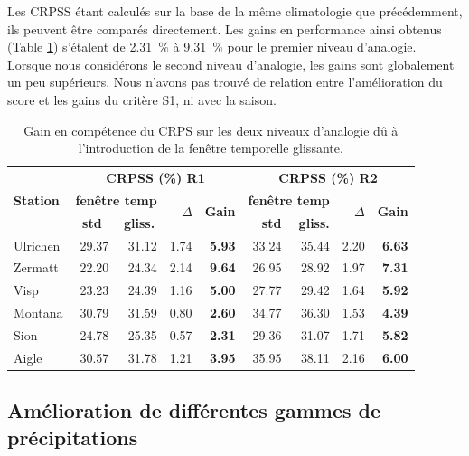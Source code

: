 \documentclass[hess]{copernicus}
\begin{document}
Les CRPSS étant calculés sur la base de la même climatologie que précédemment, ils peuvent être comparés directement. Les gains en performance ainsi obtenus (Table \ref{tab:fenetre_glissante:Gains_CRPSS}) s'étalent de 2.31~\% à 9.31~\% pour le premier niveau d'analogie. Lorsque nous considérons le second niveau d'analogie, les gains sont globalement un peu supérieurs. Nous n'avons pas trouvé de relation entre l'amélioration du score et les gains du critère S1, ni avec la saison.


\begin{table}[htb]
	\caption{Gain en compétence du CRPS sur les deux niveaux d'analogie dû à l'introduction de la fenêtre temporelle glissante.}
	\begin{center}
		\begin{tabular}{l r r r r r r r r}
			\hline
			\multirow{3}{*}{\textbf{Station}} & \multicolumn{ 4}{c}{\textbf{CRPSS (\%) R1}} & \multicolumn{ 4}{c}{\textbf{CRPSS (\%) R2}} \\
			& \multicolumn{ 2}{c}{\textbf{fenêtre temp}} & \multirow{2}{*}{\textbf{$\Delta$}} & \multirow{2}{*}{\textbf{Gain}} & \multicolumn{ 2}{c}{\textbf{fenêtre temp}} & \multirow{2}{*}{\textbf{$\Delta$}} & \multirow{2}{*}{\textbf{Gain}} \\
			& \multicolumn{1}{c}{\textbf{std}} & \multicolumn{1}{c}{\textbf{gliss.}} &  &  & \textbf{std} & \textbf{gliss.} &  & \\ 
			\hline
			Ulrichen & 29.37 & 31.12 & 1.74 & \textbf{5.93} & 33.24 & 35.44 & 2.20 & \textbf{6.63} \\ \hline
			Zermatt & 22.20 & 24.34 & 2.14 & \textbf{9.64} & 26.95 & 28.92 & 1.97 & \textbf{7.31} \\ \hline
			Visp & 23.23 & 24.39 & 1.16 & \textbf{5.00} & 27.77 & 29.42 & 1.64 & \textbf{5.92} \\ \hline
			Montana & 30.79 & 31.59 & 0.80 &\textbf{ 2.60} & 34.77 & 36.30 & 1.53 & \textbf{4.39} \\ \hline
			Sion & 24.78 & 25.35 & 0.57 & \textbf{2.31} & 29.36 & 31.07 & 1.71 & \textbf{5.82} \\ \hline
			Aigle & 30.57 & 31.78 & 1.21 & \textbf{3.95} & 35.95 & 38.11 & 2.16 & \textbf{6.00} \\ \hline
		\end{tabular}
	\end{center}
	\label{tab:fenetre_glissante:Gains_CRPSS}
\end{table}


\subsection{Amélioration de différentes gammes de précipitations}
\label{sec:ameliorations:fenetre:gammes_precip}
\end{document}
